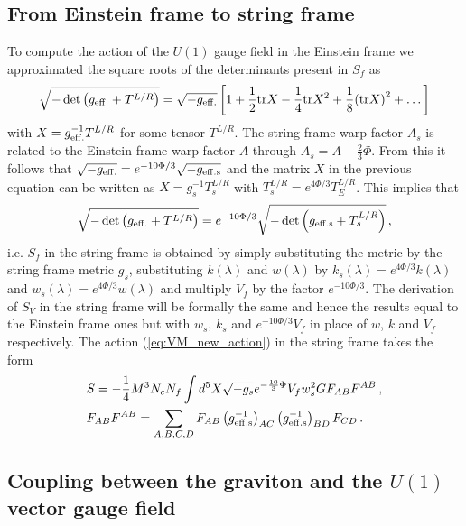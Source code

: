 \documentclass[a4paper,12pt]{article}
\begin{document}
\subsection*{From Einstein frame to string frame}

To compute the action of the $U(1)$ gauge field in the Einstein frame we approximated the square roots of the determinants present in $S_f$ as
\begin{align}
\sqrt{-\det \left( g_{\rm{eff.}} + T^{L/R} \right)} = \sqrt{-g_{\rm{eff.}}} \left[ 1 + \frac{1}{2} \text{tr} X - \frac{1}{4} \text{tr} X^2 + \frac{1}{8} {\left( \text{tr} X \right)}^2 + \dots \right]
\end{align}
with $X = g^{-1}_{\rm{eff.}} T^{L/R}$ for some tensor $T^{L/R}$.
The string frame warp factor $A_s$ is related to the Einstein frame warp factor $A$ through $A_s = A + \frac{2}{3} \Phi$. From this it follows that $\sqrt{-g_{\rm{eff.}}} = e^{- 10 \Phi / 3} \sqrt{-g_{\rm{eff.} s}}$ and the matrix $X$ in the previous equation can be written as $X = g_s^{-1} T^{L/R}_s$ with $T^{L/R}_s = e^{4 \Phi / 3} T^{L/R}_E$. This implies that
\begin{align}
\sqrt{-\det \left( g_{\rm{eff.}} + T^{L/R} \right)} = e^{- 10 \Phi / 3} \sqrt{-\det \left( g_{\rm{eff.} s} + T^{L/R}_s \right)} \, ,
\end{align}
i.e.  $S_f$ in the string frame is obtained by simply substituting the metric by the string frame metric $g_s$, substituting $k\left(\lambda\right)$ and $w\left(\lambda\right)$ by $k_s \left(\lambda\right) = e^{4 \Phi / 3} k\left(\lambda\right) $ and $w_s \left(\lambda\right) = e^{4 \Phi / 3} w\left(\lambda\right) $ and multiply $V_f$ by the factor $e^{-10 \Phi / 3}$. The derivation of $S_V$ in the string frame will be formally the same and hence the results equal to the Einstein frame ones but with $w_s$, $k_s$ and $e^{-10 \Phi / 3} V_f$ in place of $w$, $k$ and $V_f$ respectively. The action (\ref{eq:VM_new_action}) in the string frame takes the form
\begin{align}
&S = - \frac{1}{4} M^3 N_c N_f \int d^5 X \sqrt{-g_s} e^{-\frac{10}{3} \Phi} V_f w_s^2 G F_{AB}F^{AB}  \, , \\
& F_{AB}F^{AB} =  \sum_{A,B,C,D}F_{AB} \left(g^{-1}_{\rm{eff.} s}\right)_{AC} \left(g^{-1}_{\rm{eff.} s}\right)_{BD} F_{CD} \, .
\label{eq:VM_new_action_string_frame}
\end{align}

\subsection*{Coupling between the graviton and the $U(1)$ vector gauge field}
\end{document}
